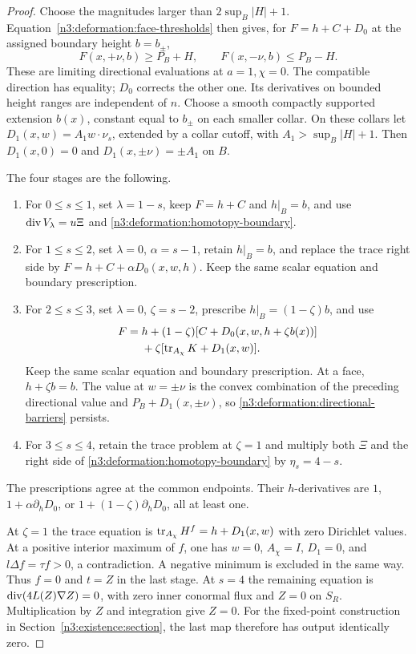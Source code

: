 \begin{proof}
Choose the magnitudes larger than $2\sup_B|H|+1$.
Equation~\eqref{n3:deformation:face-thresholds} then gives, for
$F=h+C+D_0$ at the assigned boundary height $b=b_\pm$,
\begin{equation}\label{n3:deformation:directional-barriers}
 F(x,+\nu,b)\ge P_B+H,\qquad F(x,-\nu,b)\le P_B-H.
\end{equation}
These are limiting directional evaluations at $a=1,\chi=0$.
The compatible direction has equality; $D_0$ corrects the other one.
Its derivatives on bounded height ranges are independent of $n$.
Choose a smooth compactly supported extension $b(x)$, constant equal
to $b_\pm$ on each smaller collar.
On these collars let $D_1(x,w)=A_1w\cdot\nu_s$, extended by a collar
cutoff, with $A_1>\sup_B|H|+1$.
Then $D_1(x,0)=0$ and $D_1(x,\pm\nu)=\pm A_1$ on $B$.

The four stages are the following.
\begin{enumerate}[label=\textup{(\roman*)}]
 \item For $0\le s\le1$, set $\lambda=1-s$, keep $F=h+C$ and $h|_B=b$,
 and use $\operatorname{div} V_\lambda=u\Xi$ and
 \eqref{n3:deformation:homotopy-boundary}.
 \item For $1\le s\le2$, set $\lambda=0$, $\alpha=s-1$, retain $h|_B=b$,
 and replace the trace right side by $F=h+C+\alpha D_0(x,w,h)$.
 Keep the same scalar equation and boundary prescription.
 \item For $2\le s\le3$, set $\lambda=0$, $\zeta=s-2$, prescribe
 $h|_B=(1-\zeta)b$, and use
 \begin{equation}\label{n3:deformation:interpolation-trace}
 \begin{split}
 F={}&h+(1-\zeta)[C+D_0(x,w,h+\zeta b(x))]\\
    &+\zeta[\operatorname{tr}_{A_\chi}K+D_1(x,w)].
 \end{split}
 \end{equation}
 Keep the same scalar equation and boundary prescription.
 At a face, $h+\zeta b=b$. The value at $w=\pm\nu$ is the convex
 combination of the preceding directional value and
 $P_B+D_1(x,\pm\nu)$, so \eqref{n3:deformation:directional-barriers} persists.
 \item For $3\le s\le4$, retain the trace problem at $\zeta=1$ and
 multiply both $\Xi$ and the right side of
 \eqref{n3:deformation:homotopy-boundary} by $\eta_s=4-s$.
\end{enumerate}
The prescriptions agree at the common endpoints.
Their $h$-derivatives are $1$, $1+\alpha\partial_hD_0$, or
$1+(1-\zeta)\partial_hD_0$, all at least one.

At $\zeta=1$ the trace equation is
$\operatorname{tr}_{A_\chi}H^f=h+D_1(x,w)$ with zero Dirichlet values.
At a positive interior maximum of $f$, one has $w=0$, $A_\chi=I$,
$D_1=0$, and $l\Delta f=\tau f>0$, a contradiction.
A negative minimum is excluded in the same way.
Thus $f=0$ and $t=Z$ in the last stage.
At $s=4$ the remaining equation is
$\operatorname{div}(4L(Z)\nabla Z)=0$, with zero inner conormal flux and $Z=0$ on
$S_R$. Multiplication by $Z$ and integration give $Z=0$.
For the fixed-point construction in Section~\ref{n3:existence:section},
the last map therefore has output identically zero.
\end{proof}

